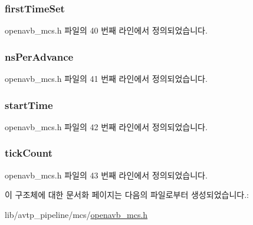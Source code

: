 \subsubsection[{\texorpdfstring{first\+Time\+Set}{firstTimeSet}}]{ first\+Time\+Set}\hypertarget{structmcs__t_a76542ec51304d98fa6a79901286a8a96}{}\label{structmcs__t_a76542ec51304d98fa6a79901286a8a96}


openavb\+\_\+mcs.\+h 파일의 40 번째 라인에서 정의되었습니다.

\subsubsection[{\texorpdfstring{ns\+Per\+Advance}{nsPerAdvance}}]{ ns\+Per\+Advance}\hypertarget{structmcs__t_a8c7e6754a1057a5f8d55b32fcbf1ae59}{}\label{structmcs__t_a8c7e6754a1057a5f8d55b32fcbf1ae59}


openavb\+\_\+mcs.\+h 파일의 41 번째 라인에서 정의되었습니다.

\subsubsection[{\texorpdfstring{start\+Time}{startTime}}]{ start\+Time}\hypertarget{structmcs__t_ae1aea99ce2da5f78fb0e3e6467975541}{}\label{structmcs__t_ae1aea99ce2da5f78fb0e3e6467975541}


openavb\+\_\+mcs.\+h 파일의 42 번째 라인에서 정의되었습니다.

\subsubsection[{\texorpdfstring{tick\+Count}{tickCount}}]{ tick\+Count}\hypertarget{structmcs__t_aab3e4c044b10fe2ea489b3949aff1090}{}\label{structmcs__t_aab3e4c044b10fe2ea489b3949aff1090}


openavb\+\_\+mcs.\+h 파일의 43 번째 라인에서 정의되었습니다.



이 구조체에 대한 문서화 페이지는 다음의 파일로부터 생성되었습니다.\+:\begin{DoxyCompactItemize}
\item 
lib/avtp\+\_\+pipeline/mcs/\hyperlink{openavb__mcs_8h}{openavb\+\_\+mcs.\+h}\end{DoxyCompactItemize}
